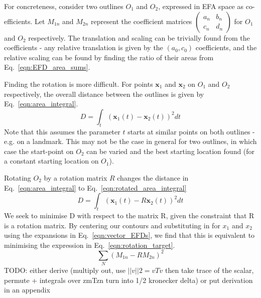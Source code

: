 \documentclass[11pt,a4paper,notitlepage]{article}
\begin{document}
For concreteness, consider two outlines $O_1$ and $O_2$, expressed in EFA space as co-efficients.
Let $M_{1n}$ and $M_{2n}$ represent the coefficient matrices $\left(\begin{smallmatrix}a_n & b_n \\ c_n & d_n\end{smallmatrix}\right)$
for $O_1$ and $O_2$ respectively.
The translation and scaling can be trivially found from the coefficients - any relative
translation is given by the $\left(a_0, c_0\right)$ coefficients, and the relative scaling
can be found by finding the ratio of their areas from Eq.~\ref{eqn:EFD_area_sums}.

Finding the rotation is more difficult.
For points $\mathbf{x}_1$ and $\mathbf{x}_2$ on $O_1$ and $O_2$ respectively, the overall distance
between the outlines is given by Eq.~\ref{eqn:area_integral}.
\begin{equation}
	\label{eqn:area_integral}
	D = \int_t \left(\mathbf{x}_1(t) - \mathbf{x}_2(t)\right)^2 dt
\end{equation}
Note that this assumes the parameter $t$ starts at similar points on both outlines - e.g. on a landmark.
This may not be the case in general for two outlines, in which case the start-point on $O_2$ can be varied and the
best starting location found (for a constant starting location on $O_1$).

Rotating $O_2$ by a rotation matrix $R$ changes the distance in Eq.~\ref{eqn:area_integral} to Eq.~\ref{eqn:rotated_area_integral}
\begin{equation}
	\label{eqn:rotated_area_integral}
	D = \int_t \left(\mathbf{x}_1(t) - R\mathbf{x}_2(t)\right)^2 dt
\end{equation}
We seek to minimise D with respect to the matrix R, given the constraint that R is a rotation matrix.
By centering our contours and substituting in for $x_1$ and $x_2$ using the expansions in Eq.~\ref{eqn:vector_EFDs}, we find that this is
equivalent to minimising the expression in Eq.~\ref{eqn:rotation_target}.
\begin{equation}
	\label{eqn:rotation_target}
	\sum_N\left(M_{1n} - RM_{2n}\right)^2
\end{equation}
TODO: either derive (multiply out, use $||v||2 = vTv$ then take trace of the scalar, permute + integrals over zmTzn turn into 1/2 kronecker delta)
or put derivation in an appendix
\end{document}
